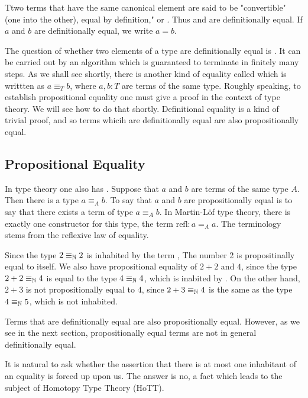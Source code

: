 Ttwo terms that have the same canonical element are said to be "convertible" (one into the other), equal by definition," or .  Thus  and  are definitionally equal.  If $a$ and $b$ are definitionally equal, we write $a = b$.  

The question of whether two elements of a type are definitionally equal is . It can be carried out by an algorithm which is guaranteed to terminate in finitely many steps.  As we shall see shortly, there is another kind of equality called  which is writtten as  $a \equiv_T b$, where $a, b: T$ are terms of the same type. Roughly speaking, to establish propositional equality one must give a proof in the context of type theory.  We will see how to do that shortly.  Definitional equality is a kind of trivial proof, and so terms whicih are definitionally equal are also propositionally equal.


\subsection{Propositional Equality}


In type theory one also has .  Suppose that $a$ and $b$ are terms of the same type $A$.  Then there is a type  $a \equiv_A b$.  To say that $a$ and $b$ are propositionally equal is to say that there exists a term of type $a \equiv_A b$.    In Martin-Löf type theory, there is exactly one constructor for this type, the term $\text{refl} : a =_A a$.    The terminology stems from the reflexive law of equality. 


Since  the type $2 \equiv_{\mathbb{N}} 2$ is inhabited by the term , The number 2 is propositinally equal to itself.  We also have propositional equality of $2 + 2$ and $4$, since the type $2 + 2 \equiv_{\mathbb{N}} 4$ is equal to the type $4 \equiv_{\mathbb{N}} 4$, which is inabited by .  On the other hand, $2 + 3$ is not propositionally equal to $4$, since $2 + 3 \equiv_{\mathbb{N}} 4$ is the same as the type $4 \equiv_{\mathbb{N}} 5$, which is not inhabited.

Terms that are definitionally equal are also propositionally equal.  However, as we see in the next section, propositionally equal terms are not in general definitionally equal.

It is natural to ask whether the assertion that there is at most one inhabitant of an equality is forced up upon us.  The answer is no, a fact which leads to the subject of Homotopy Type Theory (HoTT).


